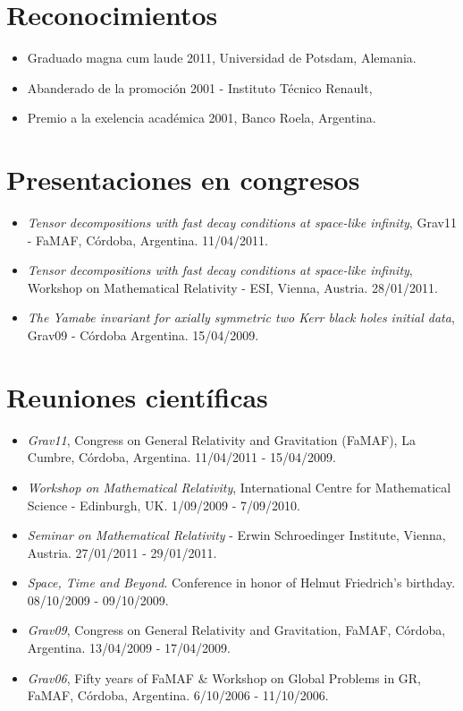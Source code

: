 \documentclass[a4paper]{article}
\begin{document}
\section{Reconocimientos}
\begin{itemize}
 \item Graduado magna cum laude 2011, Universidad de Potsdam, Alemania.
 \item Abanderado de la promoci\'on 2001 - Instituto Técnico Renault,
 \item Premio a la exelencia académica 2001, Banco Roela, Argentina.
\end{itemize}

\section{Presentaciones en congresos}
\begin{itemize}
 \item \emph{Tensor decompositions with fast decay conditions at space-like
infinity}, Grav11 - FaMAF, Córdoba, Argentina. 11/04/2011.
 \item \emph{Tensor decompositions with fast decay conditions at space-like
infinity}, Workshop on Mathematical Relativity - ESI, Vienna, Austria.
28/01/2011.
 \item \emph{The Yamabe invariant for axially symmetric two Kerr black
holes initial data}, Grav09 - Córdoba Argentina. 15/04/2009.
\end{itemize}

\section{Reuniones cient\'ificas}
\begin{itemize}
 \item \emph{Grav11}, Congress on General Relativity and Gravitation (FaMAF),
La Cumbre, Córdoba, Argentina. 11/04/2011 - 15/04/2009. 
 \item \emph{Workshop on Mathematical Relativity}, International Centre for
Mathematical Science - Edinburgh, UK. 1/09/2009 - 7/09/2010.
 \item \emph{Seminar on Mathematical Relativity} - Erwin Schroedinger
Institute, Vienna, Austria. 27/01/2011 - 29/01/2011.
 \item \emph{Space, Time and Beyond}. Conference in honor of Helmut
Friedrich's birthday.
08/10/2009 - 09/10/2009.
 \item \emph{Grav09}, Congress on General Relativity and Gravitation, FaMAF,
Córdoba, Argentina. 13/04/2009 - 17/04/2009. 
 \item \emph{Grav06}, Fifty years of FaMAF \& Workshop on Global Problems in GR,
FaMAF, Córdoba, Argentina. 6/10/2006 - 11/10/2006. %
\end{itemize}
\end{document}
